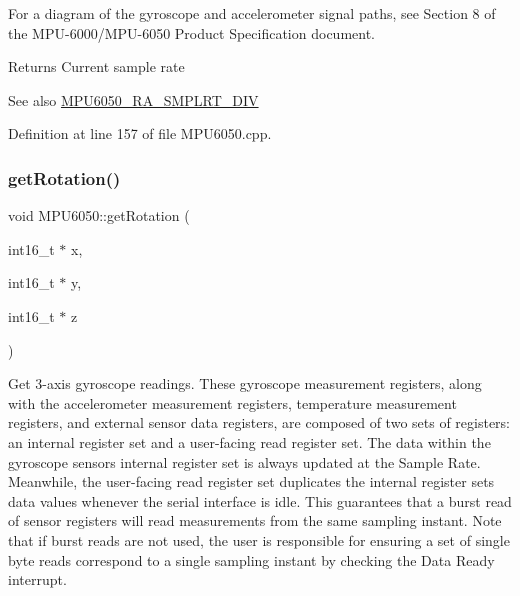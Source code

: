 For a diagram of the gyroscope and accelerometer signal paths, see Section 8 of the M\+P\+U-\/6000/\+M\+P\+U-\/6050 Product Specification document.

\begin{DoxyReturn}{Returns}
Current sample rate 
\end{DoxyReturn}
\begin{DoxySeeAlso}{See also}
\mbox{\hyperlink{MPU6050_8h_a12d24140bc78ba2db5a2e11ab32abeda}{M\+P\+U6050\+\_\+\+R\+A\+\_\+\+S\+M\+P\+L\+R\+T\+\_\+\+D\+IV}} 
\end{DoxySeeAlso}


Definition at line 157 of file M\+P\+U6050.\+cpp.


\begin{DoxyCode}{0}

\end{DoxyCode}
\mbox{\label{classMPU6050_a8ca85b87e7e0230921062fce7889b0d1}} 
\subsubsection{\texorpdfstring{getRotation()}{getRotation()}}
{\footnotesize\ttfamily void M\+P\+U6050\+::get\+Rotation (\begin{DoxyParamCaption}\item[{int16\+\_\+t $\ast$}]{x,  }\item[{int16\+\_\+t $\ast$}]{y,  }\item[{int16\+\_\+t $\ast$}]{z }\end{DoxyParamCaption})}

Get 3-\/axis gyroscope readings. These gyroscope measurement registers, along with the accelerometer measurement registers, temperature measurement registers, and external sensor data registers, are composed of two sets of registers\+: an internal register set and a user-\/facing read register set. The data within the gyroscope sensors\textquotesingle{} internal register set is always updated at the Sample Rate. Meanwhile, the user-\/facing read register set duplicates the internal register set\textquotesingle{}s data values whenever the serial interface is idle. This guarantees that a burst read of sensor registers will read measurements from the same sampling instant. Note that if burst reads are not used, the user is responsible for ensuring a set of single byte reads correspond to a single sampling instant by checking the Data Ready interrupt.

